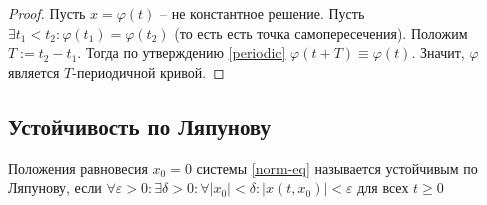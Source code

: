 \documentclass[document.tex]{subfiles}
\begin{document}
\begin{proof}
    Пусть $x = \varphi(t)$ -- не константное решение. Пусть $\exists t_1 < t_2: \varphi(t_1) = \varphi(t_2)$ (то есть
    есть точка самопересечения). Положим $T := t_2 - t_1$. Тогда по утверждению \ref{periodic} $\varphi(t + T) \equiv
    \varphi(t)$. Значит, $\varphi$ является $T$-периодичной кривой.
\end{proof}

\subsection{Устойчивость по Ляпунову}
\begin{definition}
    Положения равновесия $x_0 = 0$ системы \ref{norm-eq} называется устойчивым по Ляпунову, если $\forall \varepsilon > 0:
    \exists \delta > 0: \forall |x_0| < \delta: |x(t, x_0)| < \varepsilon$ для всех $t \geq 0$
\end{definition}
\end{document}
